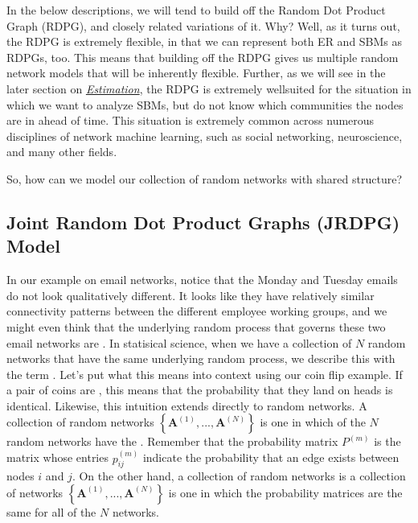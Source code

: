 \documentclass[letterpaper,10pt,english]{jupyterBook}
\begin{document}
\sphinxAtStartPar
In the below descriptions, we will tend to build off the Random Dot Product Graph (RDPG), and closely related variations of it. Why? Well, as it turns out, the RDPG is extremely flexible, in that we can represent both ER and SBMs as RDPGs, too. This means that building off the RDPG gives us multiple random network models that will be inherently flexible. Further, as we will see in the later section on {\hyperref[\detokenize{representations/ch5/multi-network-models:link?}]{\emph{Estimation}}}, the RDPG is extremely well\sphinxhyphen{}suited for the situation in which we want to analyze SBMs, but do not know which communities the nodes are in ahead of time. This situation is extremely common across numerous disciplines of network machine learning, such as social networking, neuroscience, and many other fields.

\sphinxAtStartPar
So, how can we model our collection of random networks with shared structure?


\subsection{Joint Random Dot Product Graphs (JRDPG) Model}
\label{\detokenize{representations/ch5/multi-network-models:joint-random-dot-product-graphs-jrdpg-model}}
\sphinxAtStartPar
In our example on email networks, notice that the Monday and Tuesday emails do not look  qualitatively different. It looks like they have relatively similar connectivity patterns between the different employee working groups, and we might even think that the underlying random process that governs these two email networks are . In statisical science, when we have a collection of \(N\) random networks that have the same underlying random process, we describe this with the term . Let’s put what this means into context using our coin flip example. If a pair of coins are , this means that the probability that they land on heads is identical. Likewise, this intuition extends directly to random networks. A  collection of random networks \(\left\{\mathbf A^{(1)}, ..., \mathbf A^{(N)}\right\}\) is one in which  of the \(N\) random networks have the . Remember that the probability matrix \(P^{(m)}\) is the matrix whose entries \(p^{(m)}_{ij}\) indicate the probability that an edge exists between nodes \(i\) and \(j\). On the other hand, a  collection of random networks is a collection of networks \(\left\{\mathbf A^{(1)}, ..., \mathbf A^{(N)}\right\}\) is one in which the probability matrices are  the same for all of the \(N\) networks.
\end{document}
